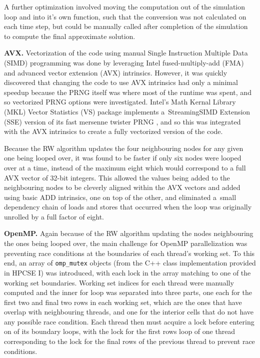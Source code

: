 \documentclass[letterpaper]{article}
\newcommand{\mypar}[1]{{\bf #1.}}
\begin{document}
A further optimization involved moving the computation out of the simulation loop and into it's own function, such that the conversion was not calculated on each time step, but could be manually called after completion of the simulation to compute the final approximate solution.

\mypar{AVX}
Vectorization of the code using manual Single Instruction Multiple Data (SIMD) programming was done by leveraging Intel fused-multiply-add (FMA) and advanced vector extension (AVX) intrinsics. However, it was quickly discovered that changing the code to use AVX intrinsics had only a minimal speedup because the PRNG itself was where most of the runtime was spent, and so vectorized PRNG options were investigated. Intel's Math Kernal Library (MKL) Vector Statistics (VS) package implements a~Streaming\linebreak SIMD Extension (SSE) version of its fast mersenne twister PRNG \cite{SFMT}, and so this was integrated with the AVX intrinsics to create a fully vectorized version of the code.

Because the RW algorithm updates the four neighbouring nodes for any given one being looped over, it was found to be faster if only six nodes were looped over at a time, instead of the maximum eight which would correspond to a full AVX vector of 32-bit integers. This allowed the values being added to the neighbouring nodes to be cleverly aligned within the AVX vectors and added using basic ADD intrinsics, one on top of the other, and eliminated a~small dependency chain of loads and stores that occurred when the loop was originally unrolled by a full factor of eight.

\mypar{OpenMP}
Again because of the RW algorithm updating the nodes neighbouring the ones being looped over, the main challenge for OpenMP parallelization was preventing race conditions at the boundaries of each thread's working set. To this end, an array of {\tt omp\_mutex} objects (from the C++ class implementation provided in HPCSE I) was introduced, with each lock in the array matching to one of the working set boundaries. Working set indices for each thread were manually computed and the inner for loop was separated into three parts, one each for the first two and final two rows in each working set, which are the ones that have overlap with neighbouring threads, and one for the interior cells that do not have any possible race condition. Each thread then must acquire a lock before entering on of its boundary loops, with the lock for the first rows loop of one thread corresponding to the lock for the final rows of the previous thread to prevent race conditions.
\end{document}
